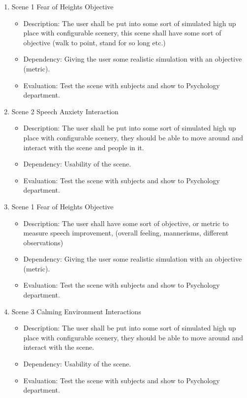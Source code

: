 \documentclass[a4paper,10pt]{article}
\begin{document}
\begin{enumerate}
		
		\item Scene 1 Fear of Heights Objective 
		\begin{itemize}
		\item Description: The user shall be put into some sort of simulated high up place with configurable scenery, this scene shall have some sort of objective (walk to point, stand for so long etc.)
		\item Dependency: Giving the user some realistic simulation with an objective (metric).
		\item Evaluation: Test the scene with subjects and show to Psychology department. 
		\end{itemize}
		
		\item Scene 2 Speech Anxiety Interaction
		\begin{itemize}
		\item Description: The user shall be put into some sort of simulated high up place with configurable scenery, they should be able to move around and interact with the scene and people in it.
		\item Dependency: Usability of the scene.
		\item Evaluation: Test the scene with subjects and show to Psychology department. 
		\end{itemize}
		\item Scene 1 Fear of Heights Objective 
		\begin{itemize}
		\item Description: The user shall have some sort of objective, or metric to measure speech improvement, (overall feeling, mannerisms, different observations)
		\item Dependency: Giving the user some realistic simulation with an objective (metric).
		\item Evaluation: Test the scene with subjects and show to Psychology department. 
		\end{itemize}
		
		
		\item Scene 3 Calming Environment Interactions
		\begin{itemize}
		\item Description: The user shall be put into some sort of simulated high up place with configurable scenery, they should be able to move around and interact with the scene.
		\item Dependency: Usability of the scene.
		\item Evaluation: Test the scene with subjects and show to Psychology department. 
		\end{itemize}
		

\end{enumerate}
\end{document}
